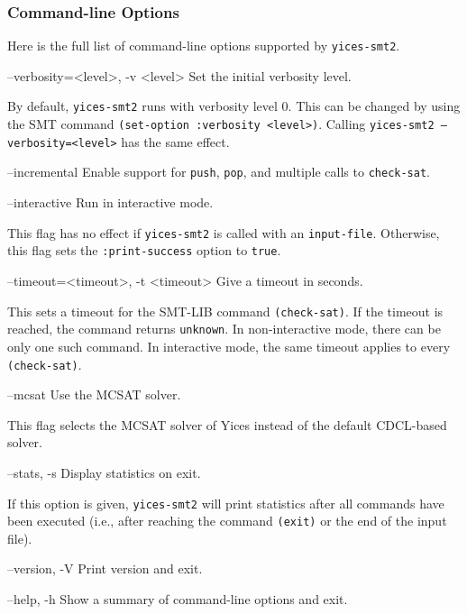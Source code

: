 \documentclass[11pt,twoside,fleqn,openright,titlepage]{cslreport}
\newenvironment{options}{
\begin{list}{}{
\setlength{\labelsep}{1.8ex}
\setlength{\labelwidth}{0pt}
\setlength{\itemindent}{-0.5\leftmargin}
\settowidth{\leftmargin}{\texttt{--}}
\renewcommand{\makelabel}{\optionlabel}}}
{\end{list}}
\newcommand*\optionlabel[1]{\hspace\labelsep\texttt{#1}}
\begin{document}
\subsubsection*{Command-line Options}

Here is the full list of command-line options supported by
\texttt{yices-smt2}.
\begin{options}
\item[--verbosity=<level>, -v <level>] Set the initial verbosity level.

  By default, \texttt{yices-smt2} runs with verbosity level 0. This
  can be changed by using the SMT command \texttt{(set-option :verbosity <level>)}.
  Calling \texttt{yices-smt2 --verbosity=<level>} has the same effect.

\item[--incremental] Enable support for \texttt{push},
  \texttt{pop}, and multiple calls to \texttt{check-sat}.

\item[--interactive] Run in interactive mode.

   This flag has no effect if \texttt{yices-smt2} is called with an
   \texttt{input-file}. Otherwise, this flag sets the
   \texttt{:print-success} option to \texttt{true}.

\item[--timeout=<timeout>, -t <timeout>] Give a timeout in seconds.

  This sets a timeout for the SMT-LIB command \texttt{(check-sat)}. If
  the timeout is reached, the command returns \texttt{unknown}. In
  non-interactive mode, there can be only one such command. In
  interactive mode, the same timeout applies to every
  \texttt{(check-sat)}.

\item[--mcsat] Use the MCSAT solver.

   This flag selects the MCSAT solver of Yices instead of the default
   CDCL-based solver.

\item[--stats, -s] Display statistics on exit.

  If this option is given, \texttt{yices-smt2} will print statistics
  after all commands have been executed (i.e., after reaching the
  command \texttt{(exit)} or the end of the input file).

\item[--version, -V] Print version and exit.

\item[--help, -h] Show a summary of command-line options and exit.

\end{options}
\end{document}

